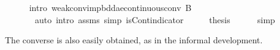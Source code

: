 \documentclass[leqno]{article}
\theoremstyle{definition}
\begin{document}
\begin{isabellebody}
\ \ \ \ \isamarkupfalse%
\ {\isacharparenleft}intro\ weak{\isacharunderscore}conv{\isacharunderscore}imp{\isacharunderscore}bdd{\isacharunderscore}ae{\isacharunderscore}continuous{\isacharunderscore}conv{\isacharbrackleft}\ B{\isacharequal}{}{\isacharbrackright}{\isacharparenright}\isanewline
\ \ \ \ \ \ \ {\isacharparenleft}auto\ intro{\isacharcolon}\ assms\ simp{\isacharcolon}\ isCont{\isacharunderscore}indicator{\isacharparenright}\isanewline
\ \ \isamarkupfalse%
\ \isamarkupfalse%
\ {\isacharquery}thesis\isanewline
\ \ \ \ \isamarkupfalse%
\ simp\isanewline
{}\isamarkupfalse%
\end{isabellebody}

\medskip

The converse is also easily obtained, as in the informal development.

\medskip
\end{document}
